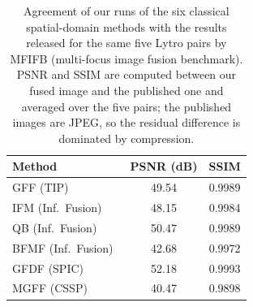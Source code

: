 \begin{table}[htbp]
\centering
\small
\setlength{\tabcolsep}{6pt}
\caption{Agreement of our runs of the six classical spatial-domain methods with the results released for the same five Lytro pairs by MFIFB (multi-focus image fusion benchmark). PSNR and SSIM are computed between our fused image and the published one and averaged over the five pairs; the published images are JPEG, so the residual difference is dominated by compression.}
\label{tab:supp_mfifb}
\begin{tabular}{lcc}
\toprule
Method & PSNR (dB) & SSIM \\
\midrule
GFF (TIP)~\cite{li2013image} & 49.54 & 0.9989 \\
IFM (Inf.\ Fusion)~\cite{li2013matting} & 48.15 & 0.9984 \\
QB (Inf.\ Fusion)~\cite{bai2015quadtree} & 50.47 & 0.9989 \\
BFMF (Inf.\ Fusion)~\cite{zhang2017boundary} & 42.68 & 0.9972 \\
GFDF (SPIC)~\cite{qiu2019guided} & 52.18 & 0.9993 \\
MGFF (CSSP)~\cite{bavirisetti2019multiscale} & 40.47 & 0.9898 \\
\bottomrule
\end{tabular}
\end{table}
